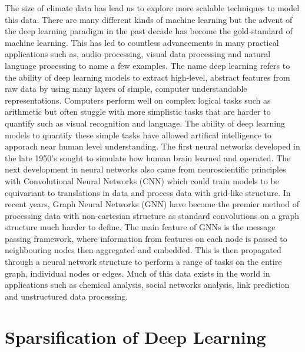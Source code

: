 \documentclass[honours,12pt]{unswthesis}
\numberwithin{equation}{section}
\begin{document}
{\noindent}The size of climate data has lead us to explore more scalable techniques to model this data.
There are many different kinds of machine learning but the advent of the deep learning paradigm in the past decade has become the gold-standard of machine learning\cite{alzubaidi2021review}.
This has led to countless advancements in many practical applications such as, audio processing\cite{adeel2020contextual}, visual data processing\cite{tian2020evolutionary} and natural language processing\cite{young2018recent} to name a few examples.
The name deep learning refers to the ability of deep learning models to extract high-level, abstract features from raw data by using many layers of simple, computer understandable representations.
Computers perform well on complex logical tasks such as arithmetic but often stuggle with more simplistic tasks that are harder to quantify such as visual recognition and language. 
The ability of deep learning models to quantify these simple tasks have allowed artifical intelligence to apporach near human level understanding.\cite{Goodfellow-et-al-2016} 
The first neural networks developed in the late 1950's sought to simulate how human brain learned and operated.\cite{Rosenblatt_1958}
The next development in neural networks also came from neuroscientific principles\cite{Hubel_Wiesel_1962} with Convolutional Neural Networks (CNN) which could train models to be equivariant to translations in data and process data with grid-like structure. 
In recent years, Graph Neural Networks (GNN) have become the premier method of processing data with non-cartesian structure as standard convolutions on a graph structure much harder to define.
The main feature of GNNs is the message passing framework, where information from features on each node is passed to neighbouring nodes then aggregated and embedded. 
This is then propagated through a neural network structure to perform a range of tasks on the entire graph, individual nodes or edges.
Much of this data exists in the world in applications such as chemical analysis\cite{xu2022chemistry}, social networks analysis\cite{rath2020detecting}, link prediction\cite{zhang2020revisiting} and unstructured data processing\cite{nouri2021improving}.

{\section{Sparsification of Deep Learning}}\label{sparsification}
\end{document}
